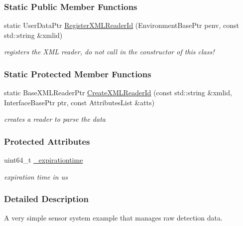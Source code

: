\subsubsection*{Static Public Member Functions}
\begin{DoxyCompactItemize}
\item 
\hypertarget{classOpenRAVE_1_1SimpleSensorSystem_a0db3cef990a8445f1969e8e8229f0091}{
static UserDataPtr \hyperlink{classOpenRAVE_1_1SimpleSensorSystem_a0db3cef990a8445f1969e8e8229f0091}{RegisterXMLReaderId} (EnvironmentBasePtr penv, const std::string \&xmlid)}
\label{classOpenRAVE_1_1SimpleSensorSystem_a0db3cef990a8445f1969e8e8229f0091}

\begin{DoxyCompactList}\small\item\em registers the XML reader, do not call in the constructor of this class! \item\end{DoxyCompactList}\end{DoxyCompactItemize}
\subsubsection*{Static Protected Member Functions}
\begin{DoxyCompactItemize}
\item 
\hypertarget{classOpenRAVE_1_1SimpleSensorSystem_abc0298dd55d4a9c57fc0c5a30ce65951}{
static BaseXMLReaderPtr \hyperlink{classOpenRAVE_1_1SimpleSensorSystem_abc0298dd55d4a9c57fc0c5a30ce65951}{CreateXMLReaderId} (const std::string \&xmlid, InterfaceBasePtr ptr, const AttributesList \&atts)}
\label{classOpenRAVE_1_1SimpleSensorSystem_abc0298dd55d4a9c57fc0c5a30ce65951}

\begin{DoxyCompactList}\small\item\em creates a reader to parse the data \item\end{DoxyCompactList}\end{DoxyCompactItemize}
\subsubsection*{Protected Attributes}
\begin{DoxyCompactItemize}
\item 
\hypertarget{classOpenRAVE_1_1SimpleSensorSystem_a7811890bab9e6b54c7b4feeffb50f1b9}{
uint64\_\-t \hyperlink{classOpenRAVE_1_1SimpleSensorSystem_a7811890bab9e6b54c7b4feeffb50f1b9}{\_\-expirationtime}}
\label{classOpenRAVE_1_1SimpleSensorSystem_a7811890bab9e6b54c7b4feeffb50f1b9}

\begin{DoxyCompactList}\small\item\em expiration time in us \item\end{DoxyCompactList}\end{DoxyCompactItemize}


\subsubsection{Detailed Description}
A very simple sensor system example that manages raw detection data. 